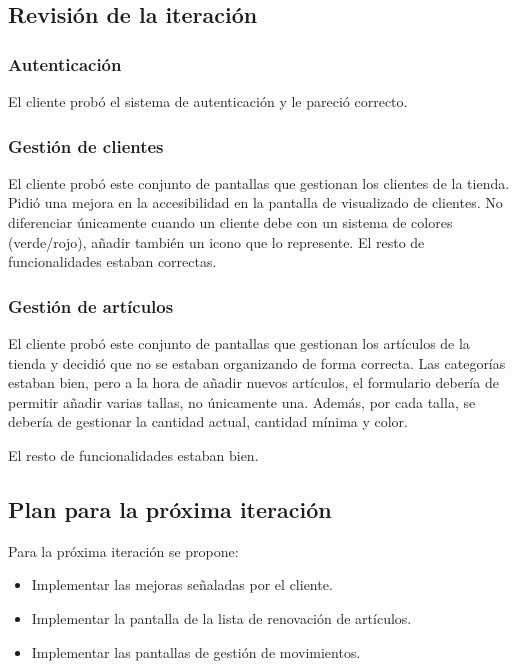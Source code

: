 \subsection{Revisión de la iteración}

\subsubsection{Autenticación}

El cliente probó el sistema de autenticación y le pareció correcto. 

\subsubsection{Gestión de clientes}

El cliente probó este conjunto de pantallas que gestionan los clientes de la tienda. Pidió una mejora en la accesibilidad en la pantalla de visualizado de clientes. No diferenciar únicamente cuando un cliente debe con un sistema de colores (verde/rojo), añadir también un icono que lo represente. El resto de funcionalidades estaban correctas. 

\subsubsection{Gestión de artículos}

El cliente probó este conjunto de pantallas que gestionan los artículos de la tienda y decidió que no se estaban organizando de forma correcta. Las categorías estaban bien, pero a la hora de añadir nuevos artículos, el formulario debería de permitir añadir varias tallas, no únicamente una. Además, por cada talla, se debería de gestionar la cantidad actual, cantidad mínima y color. 

El resto de funcionalidades estaban bien.  


\subsection{Plan para la próxima iteración}

Para la próxima iteración se propone:

\begin{itemize}
	\item Implementar las mejoras señaladas por el cliente.
	\item Implementar la pantalla de la lista de renovación de artículos.
	\item Implementar las pantallas de gestión de movimientos.
\end{itemize}

